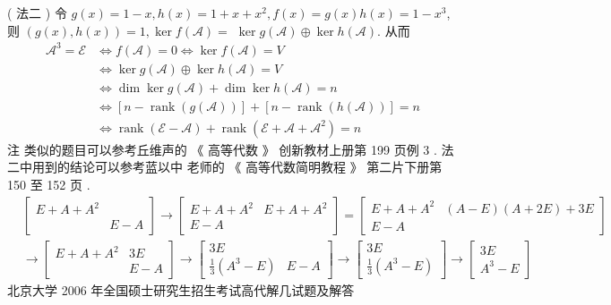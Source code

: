 \documentclass[10pt]{article}
\begin{document}
( 法二 )  令  $g(x)=1-x, h(x)=1+x+x^{2}, f(x)=g(x) h(x)=1-x^{3}$,  则  $(g(x), h(x))=1, \operatorname{ker} f(\mathscr{A})=$ $\operatorname{ker} g(\mathscr{A}) \oplus \operatorname{ker} h(\mathscr{A})$.  从而 
$$
\begin{aligned}
\mathscr{A}^{3}=\mathscr{E} & \Longleftrightarrow f(\mathscr{A})=0 \Longleftrightarrow \operatorname{ker} f(\mathscr{A})=V \\
& \Longleftrightarrow \operatorname{ker} g(\mathscr{A}) \oplus \operatorname{ker} h(\mathscr{A})=V \\
& \Longleftrightarrow \operatorname{dim} \operatorname{ker} g(\mathscr{A})+\operatorname{dim} \operatorname{ker} h(\mathscr{A})=n \\
& \Longleftrightarrow[n-\operatorname{rank}(g(\mathscr{A}))]+[n-\operatorname{rank}(h(\mathscr{A}))]=n \\
& \Longleftrightarrow \operatorname{rank}(\mathscr{E}-\mathscr{A})+\operatorname{rank}\left(\mathscr{E}+\mathscr{A}+\mathscr{A}^{2}\right)=n
\end{aligned}
$$
 注   类似的题目可以参考丘维声的 《 高等代数 》 创新教材上册第  199  页例  3 .  法二中用到的结论可以参考蓝以中   老师的 《 高等代数简明教程 》 第二片下册第  150  至  152  页 .
$$
\begin{aligned}
& \left[\begin{array}{cc}E+A+A^{2} & \\& E-A\end{array}\right] \rightarrow\left[\begin{array}{cc}E+A+A^{2} & E+A+A^{2} \\E-A\end{array}\right]=\left[\begin{array}{cc}E+A+A^{2} & (A-E)(A+2 E)+3 E \\E-A\end{array}\right] \\
& \rightarrow\left[\begin{array}{cc}E+A+A^{2} & 3 E \\& E-A\end{array}\right] \rightarrow\left[\begin{array}{cc}3 E \\\frac{1}{3}\left(A^{3}-E\right) & E-A\end{array}\right] \rightarrow\left[\begin{array}{cc}3 E \\\frac{1}{3}\left(A^{3}-E\right)\end{array}\right] \rightarrow\left[\begin{array}{ll}3 E \\A^{3}-E\end{array}\right] 
\end{aligned}
$$
 北京大学  2006  年全国硕士研究生招生考试高代解几试题及解答 
\end{document}
